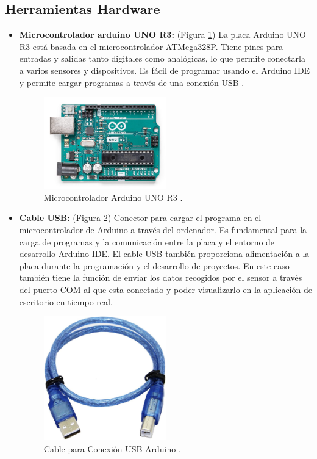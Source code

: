 \subsection{Herramientas Hardware}

\begin{itemize}

\item \textbf{Microcontrolador arduino UNO R3:} (Figura \ref{fig:Arduino})
La placa Arduino UNO R3 está basada en el microcontrolador ATMega328P. Tiene pines para entradas y salidas tanto digitales como analógicas, lo que permite conectarla a varios sensores y dispositivos. Es fácil de programar usando el Arduino IDE y permite cargar programas a través de una conexión USB \cite{ArduinoUNO3}.

\begin{figure}[h]
\centering
\includegraphics[width=0.5\textwidth]{img/arduinouno.jpg}
\caption{Microcontrolador Arduino UNO R3 \cite{ArduinoUNO3}.}
\label{fig:Arduino}
\end{figure}
\end{itemize}

\begin{itemize}
\item \textbf{Cable USB:} (Figura \ref{fig:usb
})
Conector para cargar el programa en el microcontrolador de Arduino a través del ordenador. Es fundamental para la carga de programas y la comunicación entre la placa y el entorno de desarrollo Arduino IDE. El cable USB también proporciona alimentación a la placa durante la programación y el desarrollo de proyectos. En este caso también tiene la función de enviar los datos recogidos por el sensor a través del puerto COM al que esta conectado y poder visualizarlo en la aplicación de escritorio en tiempo real.


\begin{figure}[h]
\centering
\includegraphics[width=0.5\textwidth]{img/cableUSB.jpg}
\caption{Cable para Conexión USB-Arduino \cite{CableUSB}.}
\label{fig:usb
}
\end{figure}
\end{itemize}


